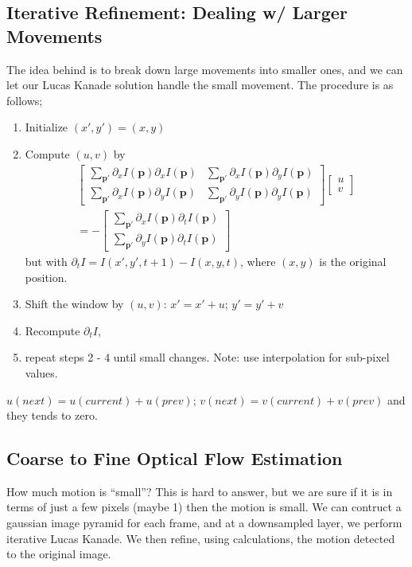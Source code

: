 \documentclass[11pt]{article}
\newcommand{\bp}{\mathbf{p}}
\begin{document}
\subsection{Iterative Refinement: Dealing w/ Larger Movements}
The idea behind is to break down large movements into smaller ones, and we can let our Lucas Kanade solution handle the small movement. The procedure is as follows;
\begin{enumerate}
	\item Initialize $(x', y') = (x, y)$
	\item Compute $(u, v)$ by
		\begin{multline}
			\left[\begin{array}{cc}
				\sum_{\bp '} \partial_x I(\bp) \partial_x I(\bp) & \sum_{\bp '} \partial_x I(\bp) \partial_y I(\bp) \\
				\sum_{\bp '} \partial_x I(\bp) \partial_y I(\bp) & \sum_{\bp '} \partial_y I(\bp) \partial_y I(\bp)
				\end{array}\right]\left[\begin{array}{l}
				u \\
				v
				\end{array}\right] \\ =-\left[\begin{array}{c}
				\sum_{\bp '} \partial_x I(\bp) \partial_t I(\bp) \\
				\sum_{\bp '} \partial_y I(\bp) \partial_t I(\bp)
			\end{array}\right]
		\end{multline}
		but with $\partial_t I = I(x', y' , t + 1) - I(x, y, t)$, where $(x, y)$ is the original position. 
	\item Shift the window by $(u, v)$: $x' = x' + u$; $y' = y' + v$
	\item Recompute $\partial_t I$,
	\item repeat steps 2 - 4 until small changes. Note: use interpolation for sub-pixel values. 
\end{enumerate}
$u(next) = u(current) + u(prev); \, v(next) = v(current) + v(prev)$ and they tends to zero. 

\subsection{Coarse to Fine Optical Flow Estimation}
How much motion is ``small''? This is hard to answer, but we are sure if it is in terms of just a few pixels (maybe 1) then the motion is small. We can contruct a gaussian image pyramid for each frame, and at a downsampled layer, we perform iterative Lucas Kanade. We then refine, using calculations, the motion detected to the original image. 
\end{document}
